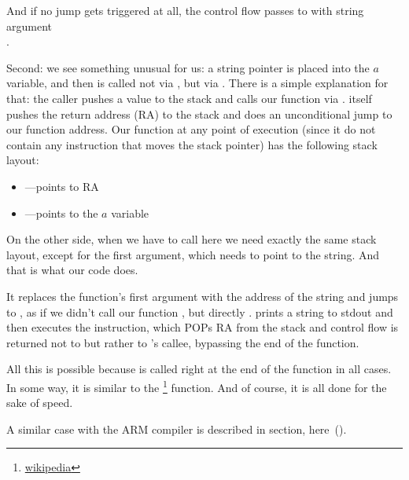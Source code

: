And if no jump gets triggered at all, the control flow passes to \printf with string argument \\
.

\label{jump_to_last_printf}
\myindex{\Stack}

Second: we see something unusual for us: a string pointer is placed into the $a$ variable, and 
then \printf is called not via \CALL, but via \JMP. There is a simple explanation for that: 
the \gls{caller} pushes a value to the stack and calls our function via \CALL. 
\CALL itself pushes the return address (\ac{RA}) to the stack and does an unconditional jump to our function address. 
Our function at any point of execution (since it do not contain any instruction that moves the stack 
pointer) has the following stack layout:

\begin{itemize}
\item\ESP---points to \ac{RA}
\item{}---points to the $a$ variable 
\end{itemize}

On the other side, when we have to call \printf here we need exactly the same stack 
layout, except for the first \printf argument, which needs to point to the string. 
And that is what our code does.

It replaces the function's first argument with the address of the string and 
jumps to \printf, as if we didn't call our function \ttf, but directly \printf.
\printf prints a string to \gls{stdout} and then executes the \RET instruction, which POPs 
\ac{RA} from the stack and control flow is returned not to \ttf but rather to \ttf's \gls{callee}, 
bypassing the end of the \ttf function.

\newcommand{\URLSJ}{\href{http://go.yurichev.com/17121}{wikipedia}}

All this is possible because \printf is called right at the end of the \ttf function in all cases. 
In some way, it is similar to the \footnote{\URLSJ} function.
And of course, it is all done for the sake of speed.

A similar case with the ARM compiler is described in \q{\PrintfSeveralArgumentsSectionName}
section, here~().



